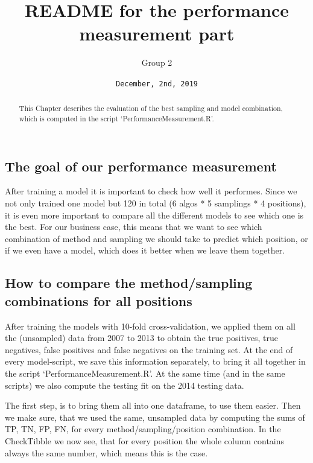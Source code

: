 \documentclass[]{article}
\title{README for the performance measurement part}
\author{Group 2}
\date{\texttt{December,\ 2nd,\ 2019}}
\begin{document}
\maketitle
\begin{abstract}
This Chapter describes the evaluation of the best sampling and model
combination, which is computed in the script `PerformanceMeasurement.R'.
\end{abstract}

\hypertarget{the-goal-of-our-performance-measurement}{%
\subsection{The goal of our performance
measurement}\label{the-goal-of-our-performance-measurement}}

After training a model it is important to check how well it performes.
Since we not only trained one model but 120 in total (6 algos * 5
samplings * 4 positions), it is even more important to compare all the
different models to see which one is the best. For our business case,
this means that we want to see which combination of method and sampling
we should take to predict which position, or if we even have a model,
which does it better when we leave them together.

\hypertarget{how-to-compare-the-methodsampling-combinations-for-all-positions}{%
\subsection{How to compare the method/sampling combinations for all
positions}\label{how-to-compare-the-methodsampling-combinations-for-all-positions}}

After training the models with 10-fold cross-validation, we applied them
on all the (unsampled) data from 2007 to 2013 to obtain the true
positives, true negatives, false positives and false negatives on the
training set. At the end of every model-script, we save this information
separately, to bring it all together in the script
`PerformanceMeasurement.R'. At the same time (and in the same scripts)
we also compute the testing fit on the 2014 testing data.

The first step, is to bring them all into one dataframe, to use them
easier. Then we make sure, that we used the same, unsampled data by
computing the sums of TP, TN, FP, FN, for every method/sampling/position
combination. In the CheckTibble we now see, that for every position the
whole column contains always the same number, which means this is the
case.
\end{document}

